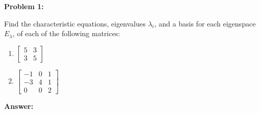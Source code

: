 \documentclass[10pt,letterpaper,final]{report}
\begin{document}
\begin{center}
  \vline
\end{center}

\medskip
\noindent\textbf{Problem 1:}
\medskip

Find the characteristic equations, eigenvalues $\lambda_i$, and a basis for each eigenspace $E_\lambda$, of each of the following matrices:

\begin{enumerate}[label=(\alph*)]
  \item $\begin{bmatrix}
            5 & 3 \\
            3 & 5
          \end{bmatrix}$
  \item $\begin{bmatrix}
            -1 & 0 & 1 \\
            -3 & 4 & 1 \\
            0  & 0 & 2
          \end{bmatrix}$
\end{enumerate}

\medskip
\noindent\textbf{Answer:}
\end{document}
